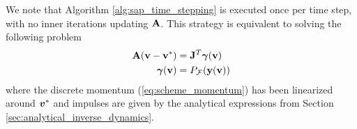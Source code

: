 We note that Algorithm \ref{alg:sap_time_stepping} is executed once per time
step, with no inner iterations updating ${\mathbf{A}}$. This strategy is equivalent to
solving the following problem
\begin{align*}
	{\mathbf{A}}({\mathbf{v}}-{\mathbf{v}}^*) &= {\mathbf{J}}^T{\mathbf{{\bm\gamma}}}({\mathbf{v}})\\	
	{\bm\gamma}({\mathbf{v}}) &= P_{\mathcal{F}}({\mathbf{y}}({\mathbf{v}}))
\end{align*}
where the discrete momentum (\ref{eq:scheme_momentum}) has been linearized
around ${\bm{v}}^*$ and impulses are given by the analytical expressions from
Section \ref{sec:analytical_inverse_dynamics}.